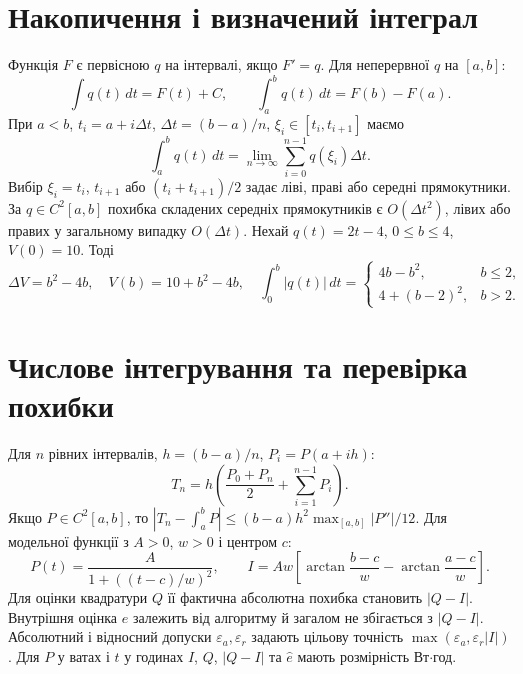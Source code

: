 \documentclass[11pt,a4paper]{article}
\begin{document}
\section{Накопичення і визначений інтеграл}
Функція $F$ є первісною $q$ на інтервалі, якщо $F'=q$. Для неперервної $q$ на $[a,b]$:
\[
 \int q(t)\,dt=F(t)+C,\qquad \int_a^b q(t)\,dt=F(b)-F(a).
\]
При $a<b$, $t_i=a+i\Delta t$, $\Delta t=(b-a)/n$, $\xi_i\in[t_i,t_{i+1}]$ маємо
\[
 \int_a^b q(t)\,dt=\lim_{n\to\infty}\sum_{i=0}^{n-1}q(\xi_i)\Delta t .
\]
Вибір $\xi_i=t_i$, $t_{i+1}$ або $(t_i+t_{i+1})/2$ задає ліві, праві або середні прямокутники. За $q\in C^2[a,b]$ похибка складених середніх прямокутників є $O(\Delta t^2)$, лівих або правих у загальному випадку $O(\Delta t)$.
Нехай $q(t)=2t-4$, $0\le b\le4$, $V(0)=10$. Тоді
\[
 \Delta V=b^2-4b,\quad V(b)=10+b^2-4b,\quad
 \int_0^b |q(t)|\,dt=
 \begin{cases}4b-b^2,&b\le2,\\4+(b-2)^2,&b>2.\end{cases}
\]
\section{Числове інтегрування та перевірка похибки}
Для $n$ рівних інтервалів, $h=(b-a)/n$, $P_i=P(a+ih)$:
\[
 T_n=h\left(\frac{P_0+P_n}{2}+\sum_{i=1}^{n-1}P_i\right).
\]
Якщо $P\in C^2[a,b]$, то
$\left|T_n-\int_a^b P\right|\le (b-a)h^2\max_{[a,b]}|P''|/12$.
Для модельної функції з $A>0$, $w>0$ і центром $c$:
\[
 P(t)=\frac{A}{1+((t-c)/w)^2},\qquad
 I=Aw\left[\arctan\frac{b-c}{w}-\arctan\frac{a-c}{w}\right].
\]
Для оцінки квадратури $Q$ її фактична абсолютна похибка становить $|Q-I|$. Внутрішня оцінка $\widehat e$ залежить від алгоритму й загалом не збігається з $|Q-I|$.
Абсолютний і відносний допуски $\varepsilon_a,\varepsilon_r$ задають цільову точність $\max(\varepsilon_a,\varepsilon_r|I|)$. Для $P$ у ватах і $t$ у годинах $I$, $Q$, $|Q-I|$ та $\widehat e$ мають розмірність Вт$\cdot$год.
\end{document}
